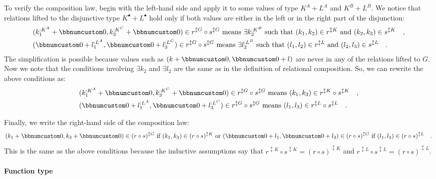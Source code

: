 To verify the composition law, begin with the left-hand side and apply
it to some values of type $K^{A}+L^{A}$ and $K^{B}+L^{B}$. We notice
that relations lifted to the disjunctive type $K^{\bullet}+L^{\bullet}$
hold only if both values are either in the left or in the right part
of the disjunction:
\begin{align*}
 & (k_{1}^{:K^{A}}+\bbnum 0,k_{3}^{:K^{C}}+\bbnum 0)\in r^{\updownarrow G}\circ s^{\updownarrow G}\text{ means }\exists k_{2}^{:K^{B}}\text{ such that }(k_{1},k_{2})\in r^{\updownarrow K}\text{ and }(k_{2},k_{3})\in s^{\updownarrow K}\quad,\\
 & (\bbnum 0+l_{1}^{:L^{A}},\bbnum 0+l_{3}^{:L^{C}})\in r^{\updownarrow G}\circ s^{\updownarrow G}\text{ means }\exists l_{2}^{:L^{B}}\text{ such that }(l_{1},l_{2})\in r^{\updownarrow L}\text{ and }(l_{2},l_{3})\in s^{\updownarrow L}\quad.
\end{align*}
The simplification is possible because values such as $(k+\bbnum 0,\bbnum 0+l)$
are never in any of the relations lifted to $G$. Now we note that
the conditions involving $\exists k_{2}$ and $\exists l_{2}$ are
the same as in the definition of relational composition. So, we can
rewrite the above conditions as:
\begin{align*}
 & (k_{1}^{:K^{A}}+\bbnum 0,k_{3}^{:K^{C}}+\bbnum 0)\in r^{\updownarrow G}\circ s^{\updownarrow G}\text{ means }(k_{1},k_{3})\in r^{\updownarrow K}\circ s^{\updownarrow K}\quad,\\
 & (\bbnum 0+l_{1}^{:L^{A}},\bbnum 0+l_{3}^{:L^{C}})\in r^{\updownarrow G}\circ s^{\updownarrow G}\text{ means }(l_{1},l_{3})\in r^{\updownarrow L}\circ s^{\updownarrow L}\quad.
\end{align*}

Finally, we write the right-hand side of the composition law:
\[
(k_{1}+\bbnum 0,k_{3}+\bbnum 0)\in(r\circ s)^{\updownarrow G}\text{ if }(k_{1},k_{3})\in(r\circ s)^{\updownarrow K}\text{ or }(\bbnum 0+l_{1},\bbnum 0+l_{3})\in(r\circ s)^{\updownarrow G}\text{ if }(l_{1},l_{3})\in(r\circ s)^{\updownarrow L}\quad.
\]
This is the same as the above conditions because the inductive assumptions
say that $r^{\updownarrow K}\circ s^{\updownarrow K}=(r\circ s)^{\updownarrow K}$
and $r^{\updownarrow L}\circ s^{\updownarrow L}=(r\circ s)^{\updownarrow L}$.

\paragraph{Function type}

